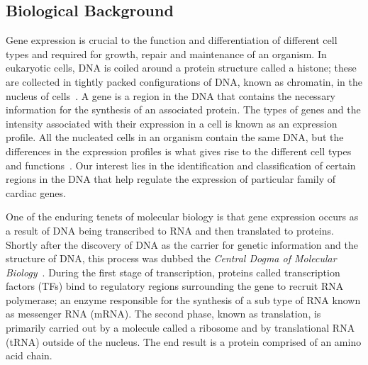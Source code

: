         \subsection{Biological Background}
        Gene expression is crucial to the function and differentiation of different cell types and required for growth, repair and maintenance of an organism.  In eukaryotic cells, DNA is coiled around a protein structure called a histone; these are collected in tightly packed configurations of DNA, known as chromatin, in the nucleus of cells~\cite{alberts2002chromosomal, kornberg1974chromatin}. A gene is a region in the DNA that contains the necessary information for the synthesis of an associated protein. The types of genes and the intensity associated with their expression in a cell is known as an expression profile. All the nucleated cells in an organism contain the same DNA, but the differences in the expression profiles is what gives rise to the different cell types and functions~\cite{lockhart2000genomics}. Our interest lies in the identification and classification of certain regions in the DNA that help regulate the expression of particular family of cardiac genes. 
        
        One of the enduring tenets of molecular biology is that gene expression occurs as a result of DNA being transcribed to RNA and then translated to proteins. Shortly after the discovery of DNA as the carrier for genetic information and the structure of DNA, this process was dubbed the \emph{Central Dogma of Molecular Biology}~\cite{crick1958protein, macleod1944studies, watson1953structure}. During the first stage of transcription, proteins called transcription factors (TFs) bind to regulatory regions surrounding the gene to recruit RNA polymerase; an enzyme responsible for the synthesis of a sub type of RNA known as messenger RNA (mRNA). The second phase, known as translation, is primarily carried out by a molecule called a ribosome and by translational RNA (tRNA) outside of the nucleus. The end result is a protein comprised of an amino acid chain.
        
